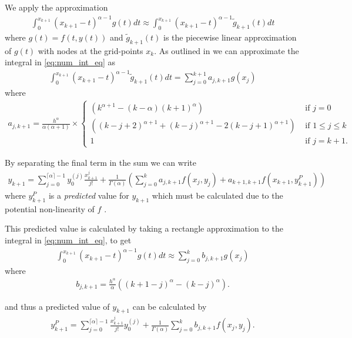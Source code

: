 We apply the approximation
\begin{align}
    \int_0^{x_{k+1}} (x_{k+1} - t)^{\alpha - 1} g(t)dt \approx \int_0^{x_{k+1}} (x_{k+1} - t)^{\alpha - 1} \tilde{g}_{k+1}(t)dt
\end{align}
where $ g(t) = f(t, y(t)) $ and $ \tilde{g}_{k+1}(t) $ is the piecewise linear approximation of $ g(t) $ with nodes at the grid-points $ x_k $. As outlined in \cite{Diethelm2004} we can approximate the integral in \eqref{eq:num_int_eq} as
\begin{align}
    \label{eq:amb_sum_1}
    \int_{0}^{x_{k+1}} (x_{k+1} - t)^{\alpha - 1} \tilde{g}_{k+1}(t) dt = \sum_{j=0}^{k+1} a_{j,k+1}g(x_j)
\end{align}
where 
\begin{align}
    a_{j,k+1} = \frac{h^\alpha}{\alpha(\alpha+1)} \times
    \begin{cases}
        (k^{\alpha+1}-(k-\alpha)(k+1)^\alpha) & \text{ if } j = 0 \\
        ((k-j+2)^{\alpha + 1} + (k-j)^{\alpha+1} - 2(k-j+1)^{\alpha+1}) & \text{ if } 1 \leq j \leq k \\
        1 & \text{ if } j = k + 1.
    \end{cases}
\end{align}

By separating the final term in the sum we can write
\begin{align}
\label{eq:amb_y_corr}
    y_{k+1} = \sum_{j=0}^{\lceil \alpha \rceil - 1} y_{0}^{(j)} \frac{x^j_{k+1}}{j!} + \frac{1}{\Gamma(\alpha)} \left( \sum_{j=0}^k a_{j,k+1} f(x_j,y_j) + a_{k+1,k+1}f(x_{k+1}, y_{k+1}^P )\right)
\end{align}
where $ y_{k+1}^P $ is a \emph{predicted} value for $ y_{k+1} $ which must be calculated due to the potential non-linearity of $ f $ \cite{Diethelm2004}.

This predicted value is calculated by taking a rectangle approximation to the integral in \eqref{eq:num_int_eq}, to get
\begin{align}
    \label{eq:amb_sum_2}
    \int_{0}^{x_{k+1}} (x_{k+1} - t)^{\alpha - 1} g(t) dt \approx \sum_{j=0}^k b_{j,k+1}g(x_j)
\end{align}
where
\begin{align}
    b_{j,k+1} = \frac{h^\alpha}{\alpha} \left( (k+1-j)^\alpha - (k-j)^\alpha \right).
\end{align}

and thus a predicted value of $ y_{k+1} $ can be calculated by
\begin{align}
    \label{eq:amb_y_pred}
    y_{k+1}^P = \sum_{j=0}^{\lceil \alpha \rceil - 1} \frac{x^{j}_{k+1}}{j!} y_{0}^{(j)} + \frac{1}{\Gamma(\alpha)} \sum_{j=0}^{k} b_{j,k+1} f(x_j, y_j).
\end{align}

